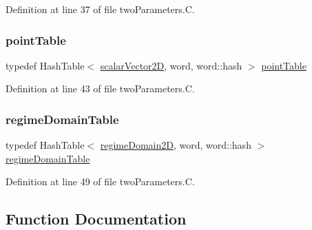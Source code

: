 Definition at line 37 of file two\+Parameters.\+C.

\mbox{\label{namespaceFoam_1_1regimeMapModels_a61a0f10fd7bfaca55fbaaea5ed75d663}} 
\subsubsection{\texorpdfstring{point\+Table}{pointTable}}
{\footnotesize\ttfamily typedef Hash\+Table$<$ \hyperlink{namespaceFoam_1_1regimeMapModels_a08598bcd83623145f1ffa4ca0c48b685}{scalar\+Vector2D}, word, word\+::hash $>$ \hyperlink{namespaceFoam_1_1regimeMapModels_a61a0f10fd7bfaca55fbaaea5ed75d663}{point\+Table}}



Definition at line 43 of file two\+Parameters.\+C.

\mbox{\label{namespaceFoam_1_1regimeMapModels_a0eedb7f1fc49fe5af3debca17ff6686e}} 
\subsubsection{\texorpdfstring{regime\+Domain\+Table}{regimeDomainTable}}
{\footnotesize\ttfamily typedef Hash\+Table$<$ \hyperlink{classFoam_1_1regimeMapModels_1_1regimeDomain2D}{regime\+Domain2D}, word, word\+::hash $>$ \hyperlink{namespaceFoam_1_1regimeMapModels_a0eedb7f1fc49fe5af3debca17ff6686e}{regime\+Domain\+Table}}



Definition at line 49 of file two\+Parameters.\+C.



\subsection{Function Documentation}
\mbox{\label{namespaceFoam_1_1regimeMapModels_a2a158634226e0f0f71ebb45c644b0f16}} 
